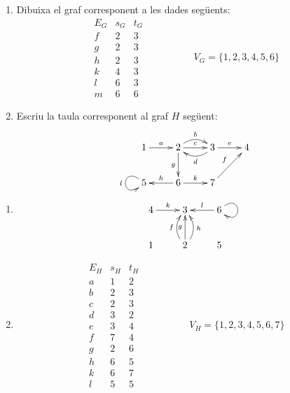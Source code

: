 \begin{exemple}\leavevmode
\begin{enumerate}
\item Dibuixa el graf corresponent a les dades següents:
\[
    \begin{array}{c|c|c}
        E_G & s_G & t_G \\ \hline
        f & 2 & 3 \\
        g & 2 & 3 \\
        h & 2 & 3 \\
        k & 4 & 3 \\
        l & 6 & 3 \\
        m & 6 & 6
    \end{array}
    \hspace{2cm} V_G=\{1,2,3,4,5,6\}
\]
\item Escriu la taula corresponent al graf $H$ següent:
\[
\xymatrix{
	1 \ar[r]^{a} & 2 \ar[d]_{g} \ar@/^2ex/[r]^-{b} \ar[r]^-{c} & 3 \ar[r]^-{e} \ar@/^2ex/[l]^-{d} & 4 \\
	5 \ar@(ul,dl)_l & 6 \ar[l]_-{h} \ar[r]^-{k} & 7 \ar[ur]^-{f}
}
\]
\end{enumerate}
\end{exemple}
\begin{solucio}\leavevmode
\begin{enumerate}
\item
\[
\xymatrix{
	4 \ar[r]^-{k} & 3 & 6 \ar[l]_-{l} \ar@(ur,dr)\\
	1 & 2 \ar@/^2ex/[u]^-{f} \ar[u]^-{g} \ar@/_2ex/[u]_{h} & 5
}
\]
\item
\[
    \begin{array}{c|c|c}
        E_H & s_H & t_H \\ \hline
        a & 1 & 2 \\
        b & 2 & 3 \\
        c & 2 & 3 \\
        d & 3 & 2 \\
        e & 3 & 4 \\
        f & 7 & 4 \\
        g & 2 & 6 \\
        h & 6 & 5 \\
        k & 6 & 7 \\
        l & 5 & 5
    \end{array}
    \hspace{2cm} V_H=\{1,2,3,4,5,6,7\}
\]
\end{enumerate}
\end{solucio}

